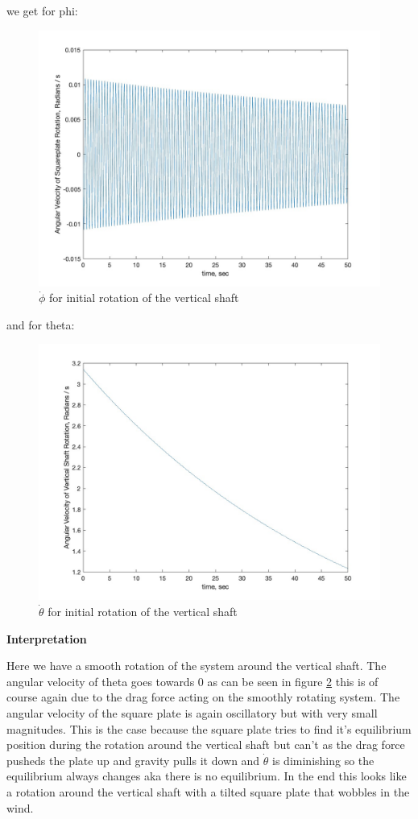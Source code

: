 we get for phi:
\begin{figure}[ht]
    \centering
    \includegraphics[scale=0.35]{images/phid_case_2.jpg}
    \caption{$\dot\phi$ for initial rotation of the vertical shaft}
    \label{fig:phid_case2}
\end{figure}
\clearpage %
and for theta:
\begin{figure}[ht]
    \centering
    \includegraphics[scale=0.35]{images/thetad_case_2.jpg}
    \caption{$\dot\theta$ for initial rotation of the vertical shaft}
    \label{fig:thetad_case2}
\end{figure}

\textbf{Interpretation}

Here we have a smooth rotation of the system around the vertical shaft. The angular velocity of theta goes towards 0 as can be seen in figure \ref{fig:thetad_case2} this is of course again due to the drag force acting on the smoothly rotating system. The angular velocity of the square plate is again oscillatory but with very small magnitudes. This is the case because the square plate tries to find it's equilibrium position during the rotation around the vertical shaft but can't as the drag force pusheds the plate up and gravity pulls it down and $\dot\theta$ is diminishing so the equilibrium always changes aka there is no equilibrium. In the end this looks like a rotation around the vertical shaft with a tilted square plate that wobbles in the wind. 

